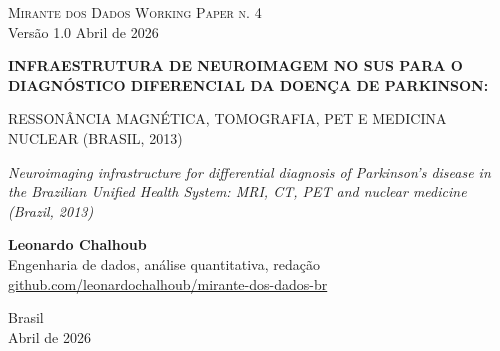 \documentclass[12pt,a4paper,oneside]{article}
\begin{document}
\begin{titlepage}
  \begin{center}
    \vspace*{1.5cm}
    {\small\textsc{Mirante dos Dados \quad\textbar\quad Working Paper n. 4}}\\
    {\small Versão 1.0 \textemdash{} Abril de 2026}

    \vfill

    {\LARGE\bfseries
     INFRAESTRUTURA DE NEUROIMAGEM NO SUS
     PARA O DIAGNÓSTICO DIFERENCIAL DA
     DOENÇA DE PARKINSON:

     RESSONÂNCIA MAGNÉTICA, TOMOGRAFIA,
     PET E MEDICINA NUCLEAR
     (BRASIL, 2013)}

    \vspace{1cm}
    {\large\itshape
     Neuroimaging infrastructure for differential diagnosis of
     Parkinson's disease in the Brazilian Unified Health System: MRI,
     CT, PET and nuclear medicine (Brazil, 2013)}

    \vfill

    {\large\textbf{Leonardo Chalhoub}}\\[6pt]
    {\small Engenharia de dados, análise quantitativa, redação}\\[6pt]
    {\small\href{https://github.com/leonardochalhoub/mirante-dos-dados-br}{github.com/leonardochalhoub/mirante-dos-dados-br}}

    \vfill

    {\small Brasil \\ Abril de 2026}
  \end{center}
\end{titlepage}

\end{document}
